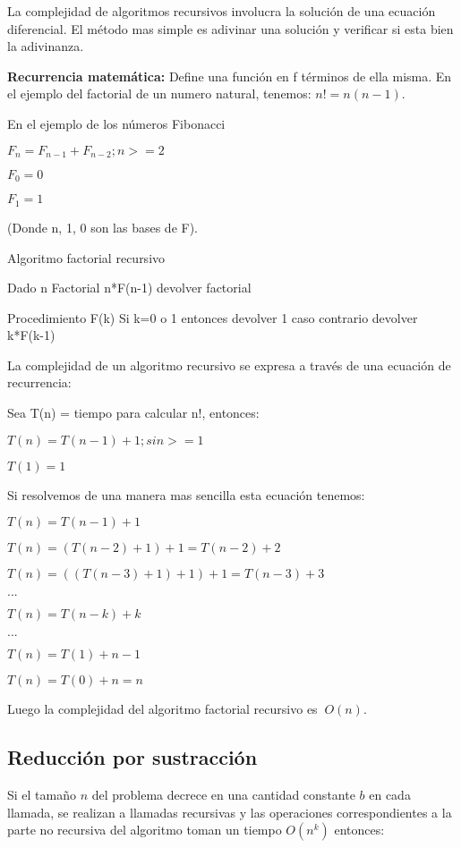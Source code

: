 La complejidad de algoritmos recursivos involucra la solución de una ecuación diferencial. El método mas simple es adivinar una solución y verificar si esta bien la adivinanza.

\textbf{Recurrencia matemática:} Define una función en f términos de ella misma. En el ejemplo del factorial de un numero natural, tenemos: $n! = n(n-1)$.

En el ejemplo de los números Fibonacci

$F_{n} = F_{n-1} + F_{n-2}  ;   n >= 2$  

$F_{0} = 0$

$F_{1} = 1$


(Donde n, 1, 0 son las bases de F).

Algoritmo factorial recursivo

Dado n
Factorial n*F(n-1) devolver factorial


Procedimiento F(k)
Si k=0 o 1 entonces devolver 1 caso contrario devolver k*F(k-1)


La complejidad de un algoritmo recursivo se expresa a través de una ecuación de recurrencia:


Sea T(n) = tiempo para calcular n!, entonces:


$T(n) = T(n-1) + 1 ;  si n >= 1$

$T(1) = 1$


Si resolvemos de una manera mas sencilla esta ecuación tenemos:


$T(n) = T(n-1) + 1$

$T(n) = (T(n-2)+1)+1   =   T(n-2) + 2$

$T(n) = ((T(n-3)+1)+1)+1   =   T(n-3) + 3$

$...$

$T(n) = T(n-k) + k$

$...$

$T(n) = T(1) + n-1$

$T(n) = T(0) + n = n$


Luego la complejidad del algoritmo factorial recursivo es $~O(n)$.

\subsection{Reducción por sustracción}

Si el tamaño  $n$ del problema decrece en una cantidad constante $b$ en cada llamada, se realizan a  llamadas recursivas y las operaciones correspondientes a la parte no recursiva del algoritmo toman un tiempo $O(n^k)$ entonces:

